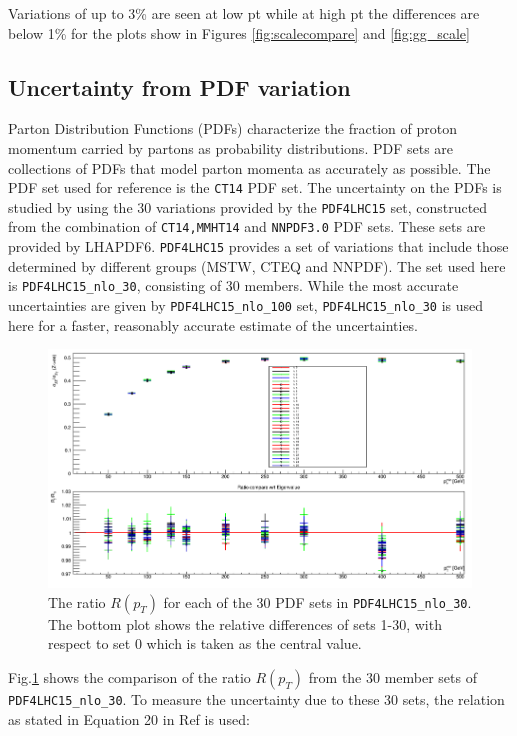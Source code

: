 \documentclass[11pt,a4paper,final]{report}
\begin{document}
Variations of up to 3\% are seen at low pt while at high pt the differences are below 1\% for the plots show in Figures \ref{fig:scalecompare} and \ref{fig:gg_scale}

\subsection{Uncertainty from PDF variation}
Parton Distribution Functions (PDFs) characterize the fraction of proton momentum carried by partons as probability distributions. PDF sets are collections of PDFs that model parton momenta as accurately as possible. The PDF set used for reference is the \texttt{CT14}\cite{CT14} PDF set. The uncertainty on the PDFs is studied by using the 30 variations provided by the \texttt{PDF4LHC15} set\cite{PDF4}, constructed from the combination of \texttt{CT14,MMHT14}\cite{MMHT14} and \texttt{NNPDF3.0}\cite{NNPDF3} PDF sets. These sets are provided by LHAPDF6\cite{LHAPDF}. \texttt{PDF4LHC15} provides a set of variations that include those determined by different groups (MSTW, CTEQ and NNPDF). The set used here is \texttt{PDF4LHC15\_nlo\_30}, consisting of 30 members. While the most accurate uncertainties are given by \texttt{PDF4LHC15\_nlo\_100} set, \texttt{PDF4LHC15\_nlo\_30} is used here for a faster, reasonably accurate estimate of the uncertainties.
\begin{figure}[H]
\centering
	\includegraphics[width = 0.8\linewidth]{PDF4_30_overlay.png}
	\caption{The ratio $R(p_T)$ for each of the 30 PDF sets in \texttt{PDF4LHC15\_nlo\_30}. The bottom plot shows the relative differences of sets 1-30, with respect to set 0 which is taken as the central value.}
	\label{fig:PDF30var}
\end{figure}
\noindent Fig.\ref{fig:PDF30var} shows the comparison of the ratio $R(p_T)$ from the 30 member sets of \texttt{PDF4LHC15\_nlo\_30}. To measure the uncertainty due to these 30 sets, the relation as stated in Equation 20 in Ref \cite{PDF4} is used:
\end{document}
